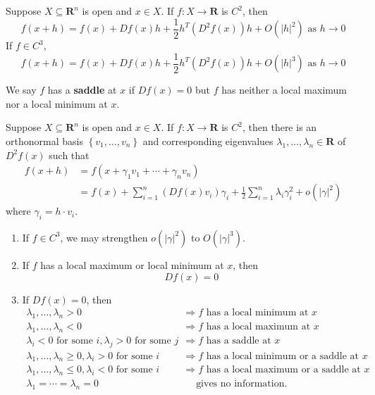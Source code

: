 \documentclass[11pt]{elegantbook}
\begin{document}
\begin{theorem}
    Suppose $X \subseteq \mathbf{R}^n$ is open and $x \in X$. If $f: X \rightarrow \mathbf{R}$ is $C^2$, then
    $$
    f(x+h)=f(x)+D f(x) h +\frac{1}{2}h^T(D^2f(x))h+O\left(|h|^2\right) \text { as } h \rightarrow 0
    $$
    If $f\in C^3$,
    $$
    f(x+h)=f(x)+D f(x) h +\frac{1}{2}h^T(D^2f(x))h+O\left(|h|^3\right) \text { as } h \rightarrow 0
    $$
\end{theorem}

\begin{definition}
    \normalfont
    We say $f$ has a \textbf{saddle} at $x$ if $D f(x)=0$ but $f$ has neither a local maximum nor a local minimum at $x$.
\end{definition}

\begin{corollary}
    Suppose $X \subseteq \mathbf{R}^n$ is open and $x \in X$. If $f: X \rightarrow \mathbf{R}$ is $C^2$, then there is an orthonormal basis $\left\{v_1, \ldots, v_n\right\}$ and corresponding eigenvalues $\lambda_1, \ldots, \lambda_n \in \mathbf{R}$ of $D^2 f(x)$ such that
    $$
    \begin{aligned}
    f(x+h) & =f\left(x+\gamma_1 v_1+\cdots+\gamma_n v_n\right) \\
    & =f(x)+\sum_{i=1}^n\left(D f(x) v_i\right) \gamma_i+\frac{1}{2} \sum_{i=1}^n \lambda_i \gamma_i^2+o\left(|\gamma|^2\right)
    \end{aligned}
    $$
    where $\gamma_i=h \cdot v_i$.
    \begin{enumerate}[1.]
        \item If $f \in C^3$, we may strengthen $o\left(|\gamma|^2\right)$ to $O\left(|\gamma|^3\right)$.
        \item If $f$ has a local maximum or local minimum at $x$, then
        $$
        D f(x)=0
        $$
        \item If $D f(x)=0$, then
        $$
        \begin{array}{rl}
        \lambda_1, \ldots, \lambda_n>0 & \Rightarrow f \text { has a local minimum at } x \\
        \lambda_1, \ldots, \lambda_n<0 & \Rightarrow f \text { has a local maximum at } x \\
        \lambda_i<0 \text { for some } i, \lambda_j>0 \text { for some } j & \Rightarrow f \text { has a saddle at } x \\
        \lambda_1, \ldots, \lambda_n \geq 0, \lambda_i>0 \text { for some } i &\Rightarrow f \text { has a local minimum or a saddle at } x \\
        \lambda_1, \ldots, \lambda_n \leq 0, \lambda_i<0 \text { for some } i &\Rightarrow f \text { has a local maximum or a saddle at } x \\
        \lambda_1=\cdots=\lambda_n=0 &\quad \text{ gives no information. }
        \end{array}
        $$
    \end{enumerate}
\end{corollary}
\end{document}
